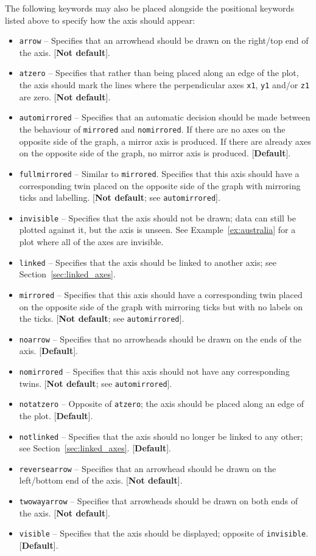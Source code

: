 The following keywords may also be placed alongside the positional keywords
listed above to specify how the axis should appear:
\begin{itemize}
\item {\tt arrow} -- Specifies that an arrowhead should be drawn on the right/top end of the axis. [{\bf Not default}].
\item {\tt atzero} -- Specifies that rather than being placed along an edge of the plot, the axis should mark the lines where the perpendicular axes {\tt x1}, {\tt y1} and/or {\tt z1} are zero. [{\bf Not default}].
\item {\tt automirrored} -- Specifies that an automatic decision should be made between the behaviour of {\tt mirrored} and {\tt nomirrored}. If there are no axes on the opposite side of the graph, a mirror axis is produced. If there are already axes on the opposite side of the graph, no mirror axis is produced. [{\bf Default}].
\item {\tt fullmirrored} -- Similar to {\tt mirrored}. Specifies that this axis should have a corresponding twin placed on the opposite side of the graph with mirroring ticks and labelling. [{\bf Not default}; see {\tt automirrored}].
\item {\tt invisible} -- Specifies that the axis should not be drawn; data can still be plotted against it, but the axis is unseen. See Example~\ref{ex:australia} for a plot where all of the axes are invisible.
\item {\tt linked} -- Specifies that the axis should be linked to another axis; see Section~\ref{sec:linked_axes}.
\item {\tt mirrored} -- Specifies that this axis should have a corresponding twin placed on the opposite side of the graph with mirroring ticks but with no labels on the ticks. [{\bf Not default}; see {\tt automirrored}].
\item {\tt noarrow} -- Specifies that no arrowheads should be drawn on the ends of the axis. [{\bf Default}].
\item {\tt nomirrored} -- Specifies that this axis should not have any corresponding twins. [{\bf Not default}; see {\tt automirrored}].
\item {\tt notatzero} -- Opposite of {\tt atzero}; the axis should be placed along an edge of the plot. [{\bf Default}].
\item {\tt notlinked} -- Specifies that the axis should no longer be linked to any other; see Section~\ref{sec:linked_axes}. [{\bf Default}].
\item {\tt reversearrow} -- Specifies that an arrowhead should be drawn on the left/bottom end of the axis. [{\bf Not default}].
\item {\tt twowayarrow} -- Specifies that arrowheads should be drawn on both ends of the axis. [{\bf Not default}].
\item {\tt visible} -- Specifies that the axis should be displayed; opposite of {\tt invisible}. [{\bf Default}].
\end{itemize}


